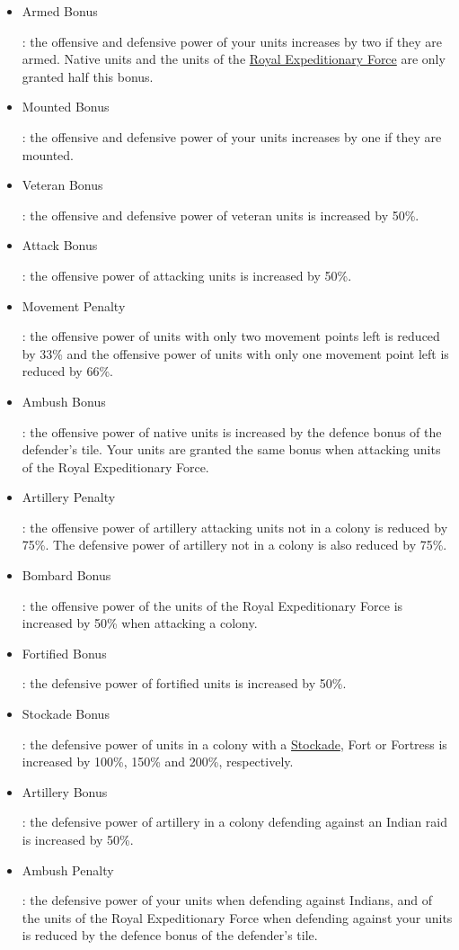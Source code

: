 \documentclass[12pt]{book}
\begin{document}
\begin{itemize}
\item \hypertarget{Armed Bonus}{Armed Bonus}: the offensive and
  defensive power of your units increases by two if they are
  armed. Native units and the units of the \hyperlink{Royal
    Expeditionary Force}{Royal Expeditionary Force} are only granted
  half this bonus.
\item \hypertarget{Mounted Bonus}{Mounted Bonus}: the offensive and
  defensive power of your units increases by one if they are mounted.
\item \hypertarget{Veteran Bonus}{Veteran Bonus}: the offensive and
  defensive power of veteran units is increased by 50\%.
\item \hypertarget{Attack Bonus}{Attack Bonus}: the offensive power of
  attacking units is increased by 50\%.
\item \hypertarget{Movement Penalty}{Movement Penalty}: the offensive
  power of units with only two movement points left is reduced by 33\%
  and the offensive power of units with only one movement point left
  is reduced by 66\%.
\item \hypertarget{Ambush Bonus}{Ambush Bonus}: the offensive power of
  native units is increased by the defence bonus of the defender's
  tile. Your units are granted the same bonus when attacking units of
  the Royal Expeditionary Force.
\item \hypertarget{Artillery Penalty}{Artillery Penalty}: the
  offensive power of artillery attacking units not in a colony is
  reduced by 75\%. The defensive power of artillery not in a colony is
  also reduced by 75\%.
\item \hypertarget{Bombard Bonus}{Bombard Bonus}: the offensive power
  of the units of the Royal Expeditionary Force is increased by 50\%
  when attacking a colony.
\item \hypertarget{Fortified Bonus}{Fortified Bonus}: the defensive
  power of fortified units is increased by 50\%.
\item \hypertarget{Stockade Bonus}{Stockade Bonus}: the defensive
  power of units in a colony with a \hyperlink{Stockade}{Stockade},
  Fort or Fortress is increased by 100\%, 150\% and 200\%,
  respectively.
\item \hypertarget{Artillery Bonus}{Artillery Bonus}: the defensive
  power of artillery in a colony defending against an Indian raid is
  increased by 50\%.
\item \hypertarget{Ambush Penalty}{Ambush Penalty}: the defensive
  power of your units when defending against Indians, and of the units
  of the Royal Expeditionary Force when defending against your units
  is reduced by the defence bonus of the defender's tile.
\end{itemize}
\end{document}
